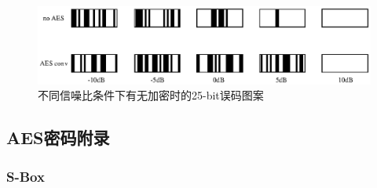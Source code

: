 \begin{figure}[h]
    \centering
    \includegraphics[width=\textwidth,trim=0 5 0 15,clip]{./pic/AES_pattern.eps}
    \caption{不同信噪比条件下有无加密时的25-bit误码图案}
\end{figure}

\subsection*{AES密码附录}

\subsubsection*{S-Box}

